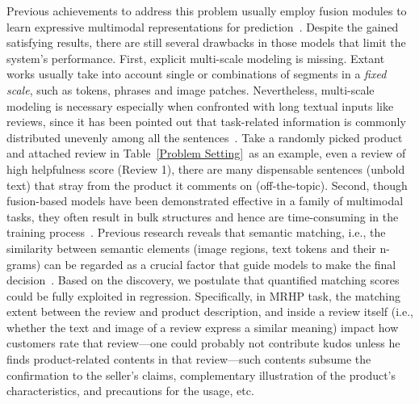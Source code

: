 Previous achievements to address this problem
usually employ fusion modules to learn expressive multimodal representations for prediction~\cite{arevalo2017gated,chen2018cross,liu2021multi,han-etal-2022-sancl,nguyen-etal-2022-adaptive}.
Despite the gained satisfying results, there are still several drawbacks in those models that limit the system's performance.
First, explicit multi-scale modeling is missing.
Extant works usually take into account single or combinations of segments in a \textit{fixed scale}, such as tokens, phrases and image patches.
Nevertheless, multi-scale modeling is necessary especially when confronted with long textual inputs like reviews, 
since it has been pointed out that task-related information is commonly distributed unevenly among all the sentences~\cite{chen2019multi}.
Take a randomly picked product and attached review in Table~\ref{Problem Setting}~as an example, even a review of high helpfulness score (Review 1), there are many dispensable sentences (unbold text) that stray from the product it comments on (off-the-topic).
Second, though fusion-based models have been demonstrated effective in a family of multimodal tasks, they often result in bulk structures and hence are time-consuming in the training process~\cite{nagrani2021attention}. 
Previous research reveals that semantic matching, i.e., the similarity between semantic elements 
(image regions, text tokens and their n-grams) 
can be regarded as a crucial factor that guide models to make the final decision~\cite{ma2015multimodal,huang2017instance,liu2017learning}.
Based on the discovery, we postulate that quantified matching scores could be fully exploited in regression.  
Specifically, in MRHP task, the matching extent between the review and product description, and inside a review itself (i.e., whether the text and image of a review 
express a similar meaning) impact how customers rate that review---one could probably not contribute kudos unless he finds product-related contents in that review---such contents subsume the confirmation to the seller's  claims, complementary illustration of the product's characteristics, and precautions for the usage, etc.

